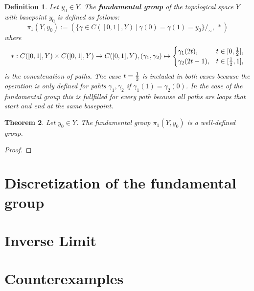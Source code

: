 \documentclass{article}
\theoremstyle{break}
\newtheorem{thm}{Theorem}[section]
\theoremstyle{break}
\newtheorem{defin}[thm]{Definition}
\begin{document}
\begin{defin}
  Let $y_0 \in Y$. The \textbf{fundamental group} of the topological space $Y$ with basepoint $y_0$ is defined as follows:
  \begin{equation*}
    \pi_1(Y, y_0) := (\{\gamma \in C([0,1],Y) \: | \: \gamma(0) = \gamma(1) = y_0\}/_{\sim}, \: *)
  \end{equation*}
  where 
  \begin{equation*} 
    *: C([0,1], Y) \times C([0,1], Y) \to C([0,1], Y), (\gamma_1, \gamma_2) \mapsto \begin{cases}
    \gamma_1(2t),   &t \in [0, {1 \over 2}], \\
    \gamma_2(2t-1), &t \in [{1 \over 2}, 1],
  \end{cases}
\end{equation*}
is the concatenation of paths. The case $t = {1\over2}$ is included in both cases because the operation is only defined for pahts $\gamma_1, \gamma_2$ if $\gamma_1(1) = \gamma_2(0)$. 
In the case of the fundamental group this is fullfilled for every path because all paths are loops that start and end at the same basepoint. 
\end{defin}

\begin{thm}
  Let $y_0 \in Y$. The fundamental group $\pi_1(Y, y_0)$ is a well-defined group. 
\end{thm}

\begin{proof}
  
\end{proof}

\section{Discretization of the fundamental group}

\section{Inverse Limit}

\section{Counterexamples}

\clearpage

\end{document}
